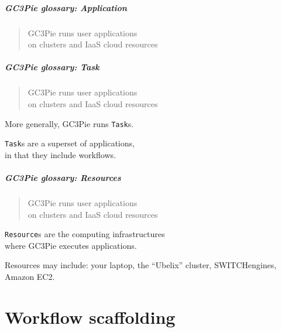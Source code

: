 \documentclass[english,serif,mathserif,xcolor=pdftex,dvipsnames,table]{beamer}
\begin{document}
\begin{frame}
  \frametitle{GC3Pie glossary: Application}
  \begin{quote}
    GC3Pie runs \alert<2-3>{user applications}
    \\
    on clusters and IaaS cloud resources
  \end{quote}

\end{frame}


\begin{frame}
  \frametitle{GC3Pie glossary: Task}
  \begin{quote}
    GC3Pie \alert{runs} user applications
    \\
    on clusters and IaaS cloud resources
  \end{quote}

  \+ More generally, GC3Pie runs \texttt{Task}s.

  \+ \texttt{Task}s are a superset of applications,
  \\ in that they include workflows.
\end{frame}


\begin{frame}
  \frametitle{GC3Pie glossary: Resources}
  \begin{quote}
    GC3Pie runs user applications
    \\
    on clusters and IaaS cloud \alert{resources}
  \end{quote}

  \+ \alert{\texttt{Resource}s are the computing infrastructures \\ where GC3Pie executes applications.}

  \+ Resources may include: your laptop, the ``Ubelix'' cluster, SWITCHengines, Amazon EC2.
\end{frame}


\part{Workflow scaffolding}
\end{document}

